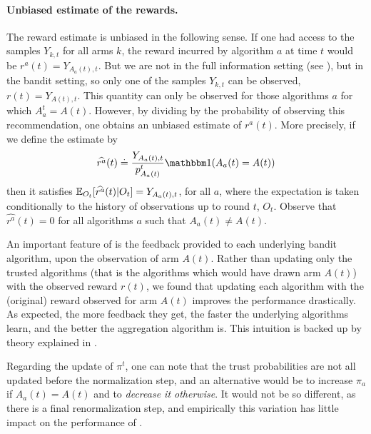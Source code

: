 \paragraph{Unbiased estimate of the rewards.}
%
The reward estimate is unbiased in the following sense. If one had access to the samples $Y_{k,t}$ for all arms $k$, the reward incurred by algorithm $a$ at time $t$ would be $r^a(t) = Y_{A_a(t),t}$.
But we are not in the full information setting (see \cite{CesaLugosi06}), but in the bandit setting, so only one of the samples $Y_{k,t}$ can be observed, $r(t)=Y_{A(t),t}$.
This quantity can only be observed for those algorithms $a$ for which $A_{a}^{t}=A(t)$.
However, by dividing by the probability of observing this recommendation, one obtains an unbiased estimate of $r^a(t)$. More precisely, if we define the estimate by
\begin{equation}
	\widehat{r^a}(t) \eqdef \frac{Y_{A_a(t),t}}{p_{A_a(t)}^{t}} \indic(A_a(t) = A(t))
\end{equation}
then it satisfies $\mathbb{E}_{O_t}[\widehat{r^a}(t) | O_t] = Y_{A_a(t),t}$, for all $a$, where the expectation is taken conditionally to the history of observations up to round $t$, $O_t$.
%
Observe that $\widehat{r^a}(t) = 0$ for all algorithms $a$ such that $A_a(t) \neq A(t)$.


An important feature of \Aggr{} is the feedback provided to each underlying bandit algorithm, upon the observation of arm $A(t)$. Rather than updating only the trusted algorithms (that is the algorithms which would have drawn arm $A(t)$) with the observed reward $r(t)$, we found that updating each algorithm with the (original) reward observed for arm $A(t)$ improves the performance drastically.
%
As expected, the more feedback they get, the faster the underlying algorithms learn, and the better the aggregation algorithm is.
This intuition is backed up by theory explained in \cite{Maillard11}.


Regarding the update of $\pi^t$, one can note that the trust probabilities are not all updated before the normalization step,
and an alternative would be to
increase $\pi_{a}$ if $A_a(t) = A(t)$ and to \emph{decrease it otherwise}.
It would not be so different, as there is a final renormalization step, and empirically this variation has little impact on the performance of \Aggr{}.



